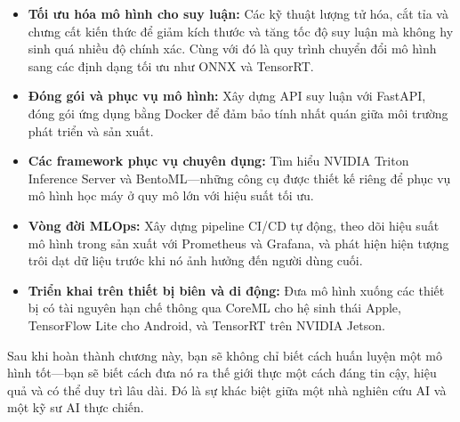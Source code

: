 \begin{itemize}
    \item \textbf{Tối ưu hóa mô hình cho suy luận:} Các kỹ thuật lượng tử hóa, cắt tỉa và chưng cất kiến thức để giảm kích thước và tăng tốc độ suy luận mà không hy sinh quá nhiều độ chính xác. Cùng với đó là quy trình chuyển đổi mô hình sang các định dạng tối ưu như ONNX và TensorRT.

    \item \textbf{Đóng gói và phục vụ mô hình:} Xây dựng API suy luận với FastAPI, đóng gói ứng dụng bằng Docker để đảm bảo tính nhất quán giữa môi trường phát triển và sản xuất.

    \item \textbf{Các framework phục vụ chuyên dụng:} Tìm hiểu NVIDIA Triton Inference Server và BentoML---những công cụ được thiết kế riêng để phục vụ mô hình học máy ở quy mô lớn với hiệu suất tối ưu.

    \item \textbf{Vòng đời MLOps:} Xây dựng pipeline CI/CD tự động, theo dõi hiệu suất mô hình trong sản xuất với Prometheus và Grafana, và phát hiện hiện tượng trôi dạt dữ liệu trước khi nó ảnh hưởng đến người dùng cuối.

    \item \textbf{Triển khai trên thiết bị biên và di động:} Đưa mô hình xuống các thiết bị có tài nguyên hạn chế thông qua CoreML cho hệ sinh thái Apple, TensorFlow Lite cho Android, và TensorRT trên NVIDIA Jetson.
\end{itemize}

Sau khi hoàn thành chương này, bạn sẽ không chỉ biết cách huấn luyện một mô hình tốt---bạn sẽ biết cách đưa nó ra thế giới thực một cách đáng tin cậy, hiệu quả và có thể duy trì lâu dài. Đó là sự khác biệt giữa một nhà nghiên cứu AI và một kỹ sư AI thực chiến.
